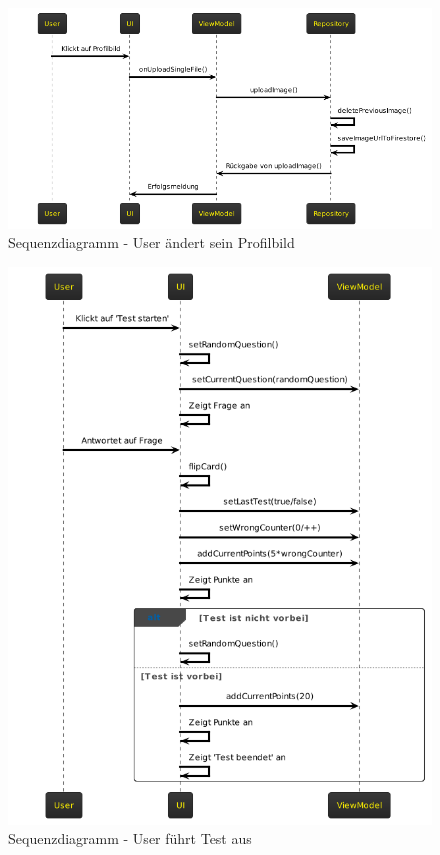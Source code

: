 \begin{figure}[H]
    \centering
    \includegraphics[width=1\textwidth]{images/diagramme/sequenzdiagramme/user_aendert_profilbild.png}
    \caption{Sequenzdiagramm - User ändert sein Profilbild}
    \label{fig:sequenz_user_aendert_profilbild}
\end{figure} 
\begin{figure}[H]
    \centering
    \includegraphics[width=1\textwidth]{images/diagramme/sequenzdiagramme/user_fuehrt_test_aus.png}
    \caption{Sequenzdiagramm - User führt Test aus}
    \label{fig:sequenz_user_fuehrt_test}
\end{figure} 
\newpage
